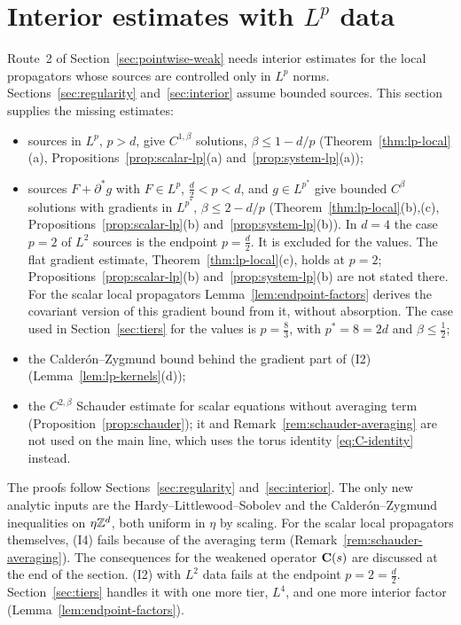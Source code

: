 \section{Interior estimates with \texorpdfstring{$L^p$}{Lp} data}\label{sec:interior-lp}

Route~2 of Section~\ref{sec:pointwise-weak} needs interior estimates for the local propagators whose sources are controlled only in $L^p$ norms. Sections~\ref{sec:regularity} and~\ref{sec:interior} assume bounded sources. This section supplies the missing estimates:
\begin{itemize}
\item[(I1)] sources in $L^p$, $p>d$, give $C^{1,\beta}$ solutions, $\beta\le1-d/p$ (Theorem~\ref{thm:lp-local}(a), Propositions~\ref{prop:scalar-lp}(a) and~\ref{prop:system-lp}(a));
\item[(I2)] sources $F+\partial^*g$ with $F\in L^p$, $\frac d2<p<d$, and $g\in L^{p^*}$ give bounded $C^\beta$ solutions with gradients in $L^{p^*}$, $\beta\le2-d/p$ (Theorem~\ref{thm:lp-local}(b),(c), Propositions~\ref{prop:scalar-lp}(b) and~\ref{prop:system-lp}(b)). In $d=4$ the case $p=2$ of $L^2$ sources is the endpoint $p=\frac d2$. It is excluded for the values. The flat gradient estimate, Theorem~\ref{thm:lp-local}(c), holds at $p=2$; Propositions~\ref{prop:scalar-lp}(b) and~\ref{prop:system-lp}(b) are not stated there. For the scalar local propagators Lemma~\ref{lem:endpoint-factors} derives the covariant version of this gradient bound from it, without absorption. The case used in Section~\ref{sec:tiers} for the values is $p=\frac83$, with $p^*=8=2d$ and $\beta\le\frac12$;
\item[(I3)] the Calder\'on--Zygmund bound behind the gradient part of (I2) (Lemma~\ref{lem:lp-kernels}(d));
\item[(I4)] the $C^{2,\beta}$ Schauder estimate for scalar equations without averaging term (Proposition~\ref{prop:schauder}); it and Remark~\ref{rem:schauder-averaging} are not used on the main line, which uses the torus identity \eqref{eq:C-identity} instead.
\end{itemize}
The proofs follow Sections~\ref{sec:regularity} and~\ref{sec:interior}. The only new analytic inputs are the Hardy--Littlewood--Sobolev and the Calder\'on--Zygmund inequalities on $\eta\mathbb Z^d$, both uniform in $\eta$ by scaling. For the scalar local propagators themselves, (I4) fails because of the averaging term (Remark~\ref{rem:schauder-averaging}). The consequences for the weakened operator $\mathbf C(s)$ are discussed at the end of the section. (I2) with $L^2$ data fails at the endpoint $p=2=\frac d2$. Section~\ref{sec:tiers} handles it with one more tier, $L^4$, and one more interior factor (Lemma~\ref{lem:endpoint-factors}).

